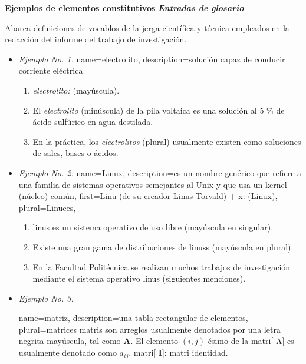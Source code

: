 \textbf{Ejemplos de elementos constitutivos}
\textit{\textbf{Entradas de glosario}}

Abarca definiciones de vocablos de la jerga científica y técnica empleados en la redacción del informe del trabajo de investigación.
\begin{itemize}

\item \textit{Ejemplo No. 1.}
{
name=electrolito,
description={solución capaz de conducir corriente eléctrica}
}
\begin{enumerate}
\item \textit{\Gls{electrolito}:} (mayúscula).
\item El \textit{\gls{electrolito}} (minúscula) de la pila voltaica es una solución  al 5 \% de ácido sulfúrico en agua destilada.
\item En la práctica, los \textit{\glspl{electrolito}} (plural) usualmente existen como soluciones de sales, bases o ácidos.
\end{enumerate}

\item \textit{Ejemplo No. 2.}
{
  name=Linux,
  description={es un nombre genérico  que refiere a una familia de sistemas operativos
  			  semejantes al Unix y que usa un kernel (núcleo) común},
  first={Linu (de su creador Linus Torvald) + x:  (Linux)},
  plural={Linuces},
}

\begin{enumerate}
\item \Gls{linus} es un sistema operativo de uso libre (mayúscula en singular).
\item Existe una gran gama de distribuciones de  \Glspl{linus} (mayúscula en plural).
\item En la Facultad Politécnica se realizan muchos trabajos de investigación mediante el sistema operativo \gls{linus} (siguientes menciones).
\end{enumerate}

\item \textit{Ejemplo No. 3.}

{
name={matriz},%
description={una tabla rectangular de elementos},%
plural={matrices}%
}
\Glspl{matri} son arreglos usualmente denotados por una letra negrita mayúscula, tal como $\mathbf{A}$. El elemento $(i,j)$-ésimo de la \gls{matri}[ A]  es usualmente denotado como $a_{ij}$. \Gls{matri}[ $\mathbf{I}$]: \gls{matri} identidad.

\end{itemize}

